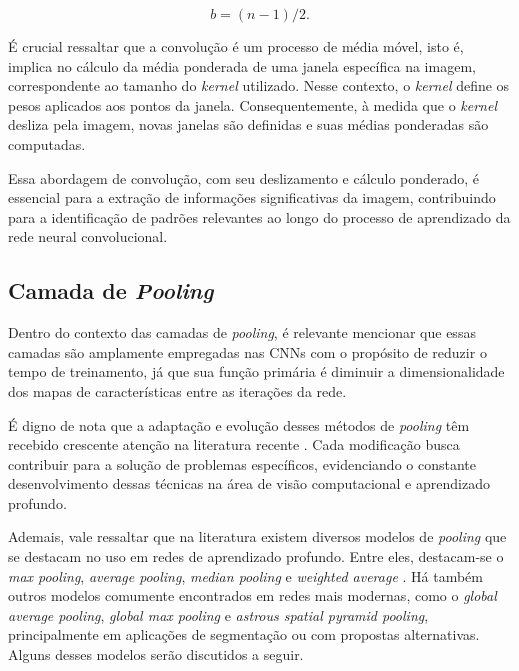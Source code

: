 \begin{equation} 
   \label{cnn:eq:col}
   b = (n-1)/2.
\end{equation}

É crucial ressaltar que a convolução é um processo de média móvel, isto é, implica no cálculo da média ponderada de uma janela específica na imagem, correspondente ao tamanho do \textit{kernel} utilizado. Nesse contexto, o \textit{kernel} define os pesos aplicados aos pontos da janela. Consequentemente, à medida que o \textit{kernel} desliza pela imagem, novas janelas são definidas e suas médias ponderadas são computadas.

Essa abordagem de convolução, com seu deslizamento e cálculo ponderado, é essencial para a extração de informações significativas da imagem, contribuindo para a identificação de padrões relevantes ao longo do processo de aprendizado da rede neural convolucional.


\subsection{Camada de \textit{Pooling}}
\label{cnn:pooling}

Dentro do contexto das camadas de \textit{pooling}, é relevante mencionar que essas camadas são amplamente empregadas nas CNNs com o propósito de reduzir o tempo de treinamento, já que sua função primária é diminuir a dimensionalidade dos mapas de características entre as iterações da rede.

É digno de nota que a adaptação e evolução desses métodos de \textit{pooling} têm recebido crescente atenção na literatura recente \citep{Sabri2020AClassificationb, Zafar2022ANetworks}. Cada modificação busca contribuir para a solução de problemas específicos, evidenciando o constante desenvolvimento dessas técnicas na área de visão computacional e aprendizado profundo.

Ademais, vale ressaltar que na literatura existem diversos modelos de \textit{pooling} que se destacam no uso em redes de aprendizado profundo. Entre eles, destacam-se o \textit{max pooling}, \textit{average pooling}, \textit{median pooling} e \textit{weighted average} \citep{Goodfellow2016}. Há também outros modelos comumente encontrados em redes mais modernas, como o \textit{global average pooling}, \textit{global max pooling} e \textit{astrous spatial pyramid pooling}, principalmente em aplicações de segmentação ou com propostas alternativas. Alguns desses modelos serão discutidos a seguir.

